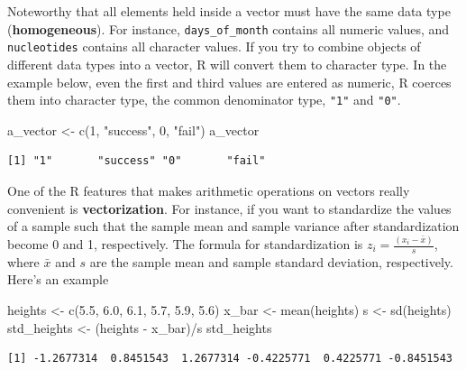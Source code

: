 \documentclass[
  letterpaper,
]{book}
\newenvironment{Shaded}{\begin{snugshade}}{\end{snugshade}}
\newcommand{\DecValTok}[1]{\textcolor[rgb]{0.68,0.00,0.00}{#1}}
\newcommand{\FloatTok}[1]{\textcolor[rgb]{0.68,0.00,0.00}{#1}}
\newcommand{\FunctionTok}[1]{\textcolor[rgb]{0.28,0.35,0.67}{#1}}
\newcommand{\NormalTok}[1]{\textcolor[rgb]{0.00,0.23,0.31}{#1}}
\newcommand{\OtherTok}[1]{\textcolor[rgb]{0.00,0.23,0.31}{#1}}
\newcommand{\SpecialCharTok}[1]{\textcolor[rgb]{0.37,0.37,0.37}{#1}}
\newcommand{\StringTok}[1]{\textcolor[rgb]{0.13,0.47,0.30}{#1}}
\begin{document}
Noteworthy that all elements held inside a vector must have the same
data type (\textbf{homogeneous}). For instance, \texttt{days\_of\_month}
contains all numeric values, and \texttt{nucleotides} contains all
character values. If you try to combine objects of different data types
into a vector, R will convert them to character type. In the example
below, even the first and third values are entered as numeric, R coerces
them into character type, the common denominator type, \texttt{"1"} and
\texttt{"0"}.

\begin{Shaded}
\begin{Highlighting}[]
\NormalTok{a\_vector }\OtherTok{\textless{}{-}} \FunctionTok{c}\NormalTok{(}\DecValTok{1}\NormalTok{, }\StringTok{"success"}\NormalTok{, }\DecValTok{0}\NormalTok{, }\StringTok{"fail"}\NormalTok{)}
\NormalTok{a\_vector}
\end{Highlighting}
\end{Shaded}

\begin{verbatim}
[1] "1"       "success" "0"       "fail"   
\end{verbatim}

One of the R features that makes arithmetic operations on vectors really
convenient is \textbf{vectorization}. For instance, if you want to
standardize the values of a sample such that the sample mean and sample
variance after standardization become 0 and 1, respectively. The formula
for standardization is \(z_{i}=\frac{(x_{i}-\bar{x})}{s}\), where
\(\bar{x}\) and \(s\) are the sample mean and sample standard deviation,
respectively. Here's an example

\begin{Shaded}
\begin{Highlighting}[]
\NormalTok{heights }\OtherTok{\textless{}{-}} \FunctionTok{c}\NormalTok{(}\FloatTok{5.5}\NormalTok{, }\FloatTok{6.0}\NormalTok{, }\FloatTok{6.1}\NormalTok{, }\FloatTok{5.7}\NormalTok{, }\FloatTok{5.9}\NormalTok{, }\FloatTok{5.6}\NormalTok{)}
\NormalTok{x\_bar }\OtherTok{\textless{}{-}} \FunctionTok{mean}\NormalTok{(heights)}
\NormalTok{s }\OtherTok{\textless{}{-}} \FunctionTok{sd}\NormalTok{(heights)}
\NormalTok{std\_heights }\OtherTok{\textless{}{-}}\NormalTok{ (heights }\SpecialCharTok{{-}}\NormalTok{ x\_bar)}\SpecialCharTok{/}\NormalTok{s}
\NormalTok{std\_heights}
\end{Highlighting}
\end{Shaded}

\begin{verbatim}
[1] -1.2677314  0.8451543  1.2677314 -0.4225771  0.4225771 -0.8451543
\end{verbatim}
\end{document}
